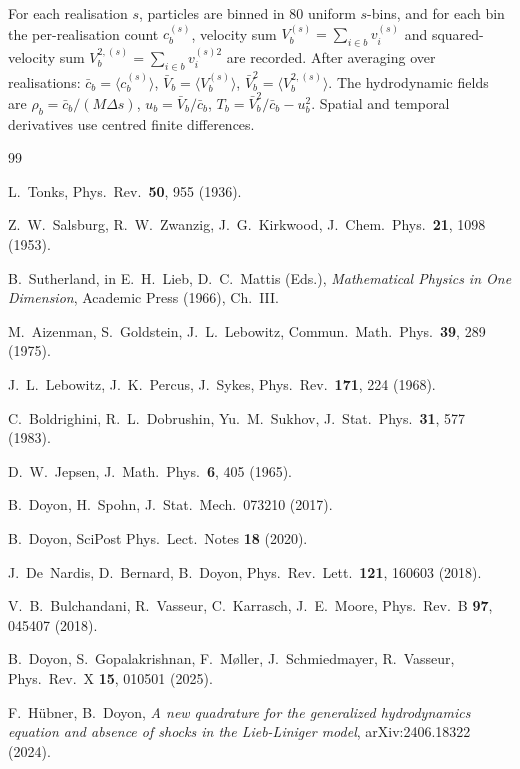 \documentclass[aps,pre,twocolumn,superscriptaddress,longbibliography,floatfix]{revtex4-2}
\begin{document}
For each realisation $s$, particles are binned in $80$ uniform
$s$-bins, and for each bin the per-realisation count $c_b^{(s)}$,
velocity sum $V_b^{(s)}=\sum_{i\in b}v_i^{(s)}$ and
squared-velocity sum $V_b^{2,(s)}=\sum_{i\in b}v_i^{(s)2}$ are
recorded. After averaging over realisations:
$\bar c_b = \langle c_b^{(s)}\rangle$,
$\bar V_b = \langle V_b^{(s)}\rangle$,
$\bar V_b^2 = \langle V_b^{2,(s)}\rangle$.
The hydrodynamic fields are
$\rho_b = \bar c_b / (M \Delta s)$,
$u_b = \bar V_b / \bar c_b$,
$T_b = \bar V_b^2/\bar c_b - u_b^2$.
Spatial and temporal derivatives use centred finite differences.

\begin{thebibliography}{99}

L.~Tonks,
Phys.~Rev.\ \textbf{50}, 955 (1936).

Z.~W.~Salsburg, R.~W.~Zwanzig, J.~G.~Kirkwood,
J.~Chem.~Phys.\ \textbf{21}, 1098 (1953).

B.~Sutherland, in
E.~H.~Lieb, D.~C.~Mattis (Eds.),
\emph{Mathematical Physics in One Dimension},
Academic Press (1966), Ch.~III.

M.~Aizenman, S.~Goldstein, J.~L.~Lebowitz,
Commun.~Math.~Phys.\ \textbf{39}, 289 (1975).

J.~L.~Lebowitz, J.~K.~Percus, J.~Sykes,
Phys.~Rev.\ \textbf{171}, 224 (1968).

C.~Boldrighini, R.~L.~Dobrushin, Yu.~M.~Sukhov,
J.~Stat.~Phys.\ \textbf{31}, 577 (1983).

D.~W.~Jepsen,
J.~Math.~Phys.\ \textbf{6}, 405 (1965).

B.~Doyon, H.~Spohn,
J.~Stat.~Mech.\ 073210 (2017).

B.~Doyon,
SciPost Phys.\ Lect.\ Notes \textbf{18} (2020).

J.~De~Nardis, D.~Bernard, B.~Doyon,
Phys.~Rev.~Lett.\ \textbf{121}, 160603 (2018).

V.~B.~Bulchandani, R.~Vasseur, C.~Karrasch, J.~E.~Moore,
Phys.~Rev.~B \textbf{97}, 045407 (2018).

B.~Doyon, S.~Gopalakrishnan, F.~M{\o}ller,
J.~Schmiedmayer, R.~Vasseur,
Phys.~Rev.~X \textbf{15}, 010501 (2025).

F.~H\"ubner, B.~Doyon,
\emph{A new quadrature for the generalized hydrodynamics
equation and absence of shocks in the Lieb-Liniger model},
arXiv:2406.18322 (2024).


\end{thebibliography}
\end{document}
